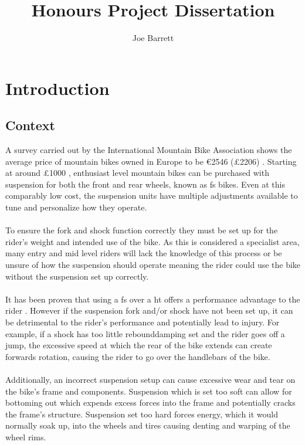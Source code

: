 \documentclass[a4paper, 12pt, hidelinks]{article}
\title{Honours Project Dissertation}
\author{Joe Barrett}
\begin{document}
	
	\begin{abstract}
		\blindtext
	\end{abstract}
	\newpage
	\tableofcontents
	\newpage
	\listoftables
	\newpage
	\listoffigures
	\newpage
	\section{Introduction}
	\subsection{Context}
	A survey carried out by the International Mountain Bike Association shows the average price of mountain bikes owned in Europe to be \euro2546 (\pounds2206) \citep{imbasurv}. Starting at around \pounds1000 \citep{giantstance}, enthusiast level mountain bikes can be purchased with suspension for both the front and rear wheels, known as \gls{fs} bikes. Even at this comparably low cost, the suspension units have multiple adjustments available to tune and personalize how they operate.
	\\\\
	To ensure the \gls{fork} and \gls{shock} function correctly they must be set up for the rider's weight and intended use of the bike. As this is considered a specialist area, many entry and mid level riders will lack the knowledge of this process or be unsure of how the suspension should operate meaning the rider could use the bike without the suspension set up correctly.
	\\\\
	It has been proven that using a \gls{fs} over a \gls{ht} offers a performance advantage to the rider \citep{fullsusperf}. However if the suspension fork and/or shock have not been set up, it can be detrimental to the rider's performance and potentially lead to injury. For example, if a shock has too little \gls{rebounddamping} set and the rider goes off a jump, the excessive speed at which the rear of the bike extends can create forwards rotation, causing the rider to go over the handlebars of the bike.
	\\\\
	Additionally, an incorrect suspension setup can cause excessive wear and tear on the bike's frame and components. Suspension which is set too soft can allow for bottoming out which expends excess forces into the frame and potentially cracks the frame's structure. Suspension set too hard forces energy, which it would normally soak up, into the wheels and tires causing denting and warping of the wheel rims.
\end{document}
